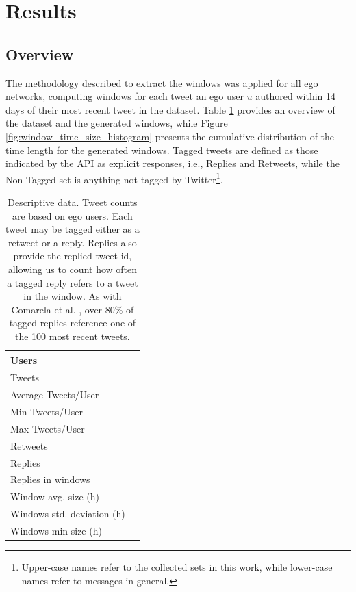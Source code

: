 \section{Results}

\subsection{Overview}

The methodology described to extract the windows was applied for all \totalUsers{} ego networks, computing windows for each tweet an ego user $u$ authored within 14 days of their most recent tweet in the dataset. 
Table \ref{tab:databaseInformation} provides an overview of the dataset and the generated windows, while Figure \ref{fig:window_time_size_histogram} presents the cumulative distribution of the time length for the generated windows.  
Tagged tweets are defined as those indicated by the API as explicit responses, i.e., Replies and Retweets, while the Non-Tagged set is anything not tagged by Twitter\footnote{\label{datasets}Upper-case names refer to the collected sets in this work, while lower-case names refer to messages in general.}. 

\begin{table}[!tb]
	\centering
	\fontsize{9pt}{10pt}\selectfont
		\begin{tabular}{|l|c|}
			\hline
			Users & \totalUsers{} \\ \hline
			Tweets & \totalTweets{} \\ \hline
			Average Tweets/User & \averageTweetsUser{} \\ \hline
			Min Tweets/User & \minTweetsUser{} \\ \hline
			Max Tweets/User & \maxTweetsUser{} \\ \hline
			Retweets & \totalRetweets{} \\ \hline
			Replies & \totalReplies{} \\ \hline
			Replies in windows & \repliesInWindows{} \\ \hline
			Window avg. size (h) & \windowAverageSize{} \\ \hline
			Windows std. deviation (h) & \windowStdSize{} \\ \hline
			Windows min size (h) & \windowMinSize{} \\ \hline
		\end{tabular}
\caption{Descriptive data. Tweet counts are based on ego users. Each tweet may be tagged either as a retweet or a reply. Replies also provide the replied tweet id, allowing us to count how often a tagged reply refers to a tweet in the window.  As with Comarela et al.  \cite{Comarela2012}, over 80\% of tagged replies reference one of the 100 most recent tweets. }
	\label{tab:databaseInformation}
\end{table}

